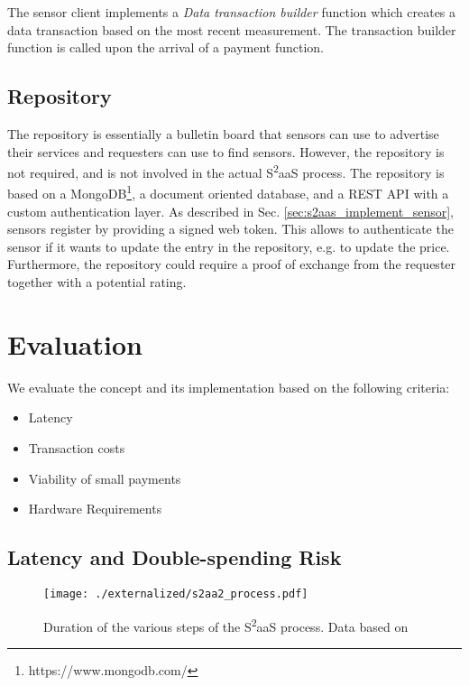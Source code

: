 The sensor client implements a \emph{Data transaction builder} function which creates a data transaction based on the most recent measurement. The transaction builder function is called upon the arrival of a payment function.

\subsection{Repository}

The repository is essentially a bulletin board that sensors can use to advertise their services and requesters can use to find sensors. However, the repository is not required, and is not involved in the actual S\textsuperscript{2}aaS process. The repository is based on a MongoDB\footnote{https://www.mongodb.com/}, a document oriented database, and a \ac{REST} \ac{API} with a custom authentication layer. As described in Sec. \ref{sec:s2aas_implement_sensor}, sensors register by providing a signed web token. This allows to authenticate the sensor if it wants to update the entry in the repository, e.g. to update the price. Furthermore, the repository could require a proof of exchange from the requester together with a potential rating. 


\section{Evaluation}
\label{sec:s2aas_eval}

We evaluate the concept and its implementation based on the following criteria:
\begin{itemize}
	\item Latency
	\item Transaction costs
    \item Viability of small payments
    \item Hardware Requirements
\end{itemize}


\subsection{Latency and Double-spending Risk}

\begin{figure}
\centering
\texttt{[image: ./externalized/s2aa2\_process.pdf]}
\caption{Duration of the various steps of the S\textsuperscript{2}aaS process. Data based on \parencite{Karame:2012:DFP:2382196.2382292,croman2016scaling}}
\label{fig:s2aasDuration}
\end{figure}

